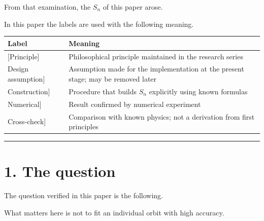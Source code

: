 \documentclass[
  a4paper,
]{article}
\newcounter{none} %
\begin{document}
From that examination, the \(S_n\) of this paper arose.

In this paper the labels are used with the following meaning.

{\def\LTcaptype{none} %
\begin{longtable}[]{@{}
  >{\raggedright\arraybackslash}p{}
  >{\raggedright\arraybackslash}p{}@{}}
\toprule\noalign{}
\begin{minipage}[b]{\linewidth}\raggedright
Label
\end{minipage} & \begin{minipage}[b]{\linewidth}\raggedright
Meaning
\end{minipage} \\
\midrule\noalign{}
\endhead
\bottomrule\noalign{}
\endlastfoot
{[}Principle{]} & Philosophical principle maintained in the research
series \\
{[}Design assumption{]} & Assumption made for the implementation at the
present stage; may be removed later \\
{[}Construction{]} & Procedure that builds \(S_n\) explicitly using
known formulas \\
{[}Numerical{]} & Result confirmed by numerical experiment \\
{[}Cross-check{]} & Comparison with known physics; not a derivation from
first principles \\
\end{longtable}
}

\begin{center}\rule{0.5\linewidth}{0.5pt}\end{center}

\section{1. The question}\label{the-question}

The question verified in this paper is the following.

\begin{center}
\end{center}

What matters here is not to fit an individual orbit with high accuracy.
\end{document}
